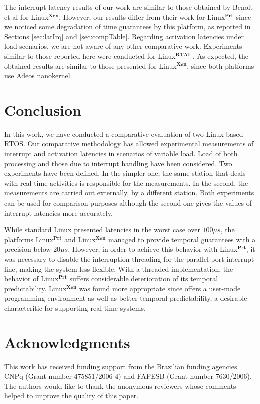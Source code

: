 \documentclass{acm_proc_article-sp}
\begin{document}
The interrupt latency results of our work are similar to those obtained by Benoit et
al \cite{Benoit05} for Linux$^{\mathbf{Xen}}$. However, our results differ from
their work for Linux$^{\mathbf{Prt}}$ since we noticed some degradation of time
guarantees by this platform, as reported in Sections \ref{sec:latIrq} and
\ref{sec:compTable}.  Regarding activation latencies under load scenarios, we are
not aware of any other comparative work. Experiments similar to those reported here
were conducted for Linux$^{\mathbf{RTAI}}$ \cite{Regnier08c}. As expected, the obtained results are
similar to those presented for Linux$^{\mathbf{Xen}}$, since both platforms use
Adeos nanokernel. 

\section{Conclusion}
\label{sec:conc}

In this work, we have conducted a comparative evaluation of two Linux-based
RTOS. Our comparative methodology has allowed experimental
measurements of interrupt and activation latencies in scenarios of variable
load. Load of both processing and those due to interrupt handling have been
considered. Two experiments have been defined.  In the simpler one, the
same station that deals with real-time activities is responsible for the
measurements. In the second, the measurements are carried out externally, by a
different station. Both experiments can be used for comparison purposes although the
second one gives the values of interrupt latencies more accurately.

While standard Linux presented latencies in the worst case over $100 \mu s$, the
platforms Linux$^{\mathbf{Prt}}$ and Linux$^{\mathbf{Xen}}$ managed to provide
temporal guarantees with a precision below $20 \mu s$. However, in order to achieve
this behavior with Linux$^{\mathbf{Prt}}$, it was necessary to disable the
interruption threading for the parallel port interrupt line, making the system less
flexible. With a threaded implementation, the behavior of Linux$^{\mathbf{Prt}}$
suffers considerable deterioration of its temporal predictability.
Linux$^{\mathbf{Xen}}$ was found more appropriate since offers a user-mode
programming environment as well as better temporal predictability, a desirable
characteritic for supporting real-time systems.


\section*{Acknowledgments}

This work has received funding support from the Brazilian funding agencies CNPq
(Grant number 475851/2006-4) and FAPESB (Grant number 7630/2006).  The authors would
like to thank the anonymous reviewers whose comments helped to improve the quality
of this paper.



\end{document}
